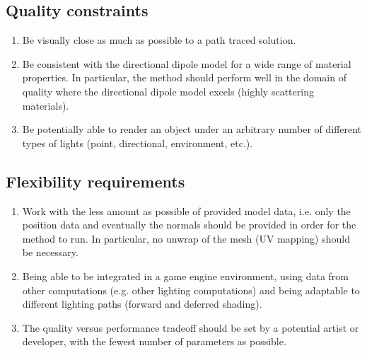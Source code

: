 \subsection{Quality constraints}
 \label{sec:quality}
\begin{enumerate}
\setlength{\itemsep}{-1pt}
	\item Be visually close as much as possible to a path traced solution.
	\item Be consistent with the directional dipole model for a wide range of material properties. In particular, the method should perform well in the domain of quality where the directional dipole model excels (highly scattering materials).
	\item Be potentially able to render an object under an arbitrary number of different types of lights (point, directional, environment, etc.).
\end{enumerate}

\subsection{Flexibility requirements}	
\begin{enumerate}
\setlength{\itemsep}{-1pt}
	\item Work with the less amount as possible of provided model data, i.e. only the position data and eventually the normals should be provided in order for the method to run. In particular, no unwrap of the mesh (UV mapping) should be necessary. 
	\item Being able to be integrated in a game engine environment, using data from other computations (e.g. other lighting computations) and being adaptable to different lighting paths (forward and deferred shading).
  \item The quality versus performance tradeoff should be set by a potential artist or developer, with the fewest number of parameters as possible.
\end{enumerate}

